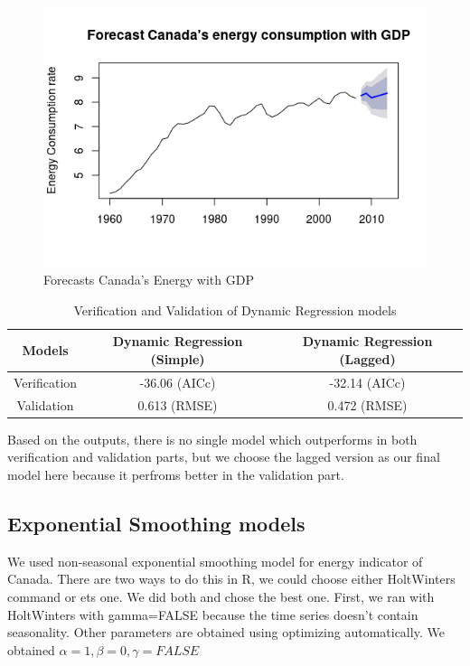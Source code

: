 \documentclass[journal, a4paper]{IEEEtran}
\begin{document}
\begin{figure}[H]
\begin{center}
\includegraphics[scale=0.4]{fig2/arima_forecast_gdp.png}
\caption{Forecasts Canada's Energy with GDP}
\label{fig2:arima_forecast_gdp}
\end{center}
\end{figure}



\begin{table}[H]
\caption{Verification and Validation of Dynamic Regression models}
\label{table:DR_verification_validation}
\centering
\begin{tabular}{|c|c|c|}
\hline
Models & Dynamic Regression (Simple) & Dynamic Regression (Lagged) \\ \hline
Verification & -36.06 (AICc) & -32.14 (AICc) \\ \hline
Validation & 0.613 (RMSE) & 0.472 (RMSE) \\
\hline
\end{tabular}
\end{table}
Based on the outputs, there is no single model which outperforms in both verification and validation parts, but we choose the lagged version as our final model here because it perfroms better in the validation part.

\subsection{Exponential Smoothing models}
We used non-seasonal exponential smoothing model for energy indicator of Canada. 
There are two ways to do this in R, we could choose either HoltWinters command or ets one. We did both and chose the best one. 
First, we ran with HoltWinters with gamma=FALSE because the time series doesn't contain seasonality.  Other parameters are obtained using optimizing automatically.  We obtained $\alpha=1, \beta=0, \gamma=FALSE$
\end{document}
